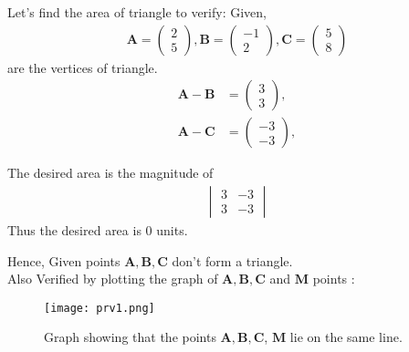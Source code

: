 \documentclass[journal,12pt,twocolumn]{IEEEtran}
\let\vec\mathbf
\newcommand{\mydet}[1]{\ensuremath{\begin{vmatrix}#1\end{vmatrix}}}
\newcommand{\myvec}[1]{\ensuremath{\begin{pmatrix}#1\end{pmatrix}}}
\begin{document}
    Let's find the area of triangle to verify:
    Given, 
    \begin{align}
		\vec{A} = \myvec{2 \\ 5} ,
		\vec{B} = \myvec{-1 \\ 2},
		\vec{C} = \myvec{5 \\ 8}
	\end{align}
	are the vertices of triangle.
	\begin{align}
	\vec{A}-\vec{B} &= \myvec{3 \\3},\\
	\vec{A}-\vec{C} &= \myvec{-3 \\-3},
	\end{align}
	
	The desired area is  the magnitude of 
    \begin{align}
     \mydet{3 & -3\\3 & -3} 
    \end{align}
    Thus the desired area is 0 units.
	
    \large Hence, Given points $\vec{A,B,C}$ don't form a triangle.\\

    \large Also Verified by plotting the graph of $\vec{A,B,C}$ and $\vec{M}$ points :

  	\begin{figure}[!ht]
		\centering
		\texttt{[image: prv1.png]}
		\caption{\large Graph showing that the points  $\vec{A}, \vec{B}, \vec{C}$, $\vec{M}$ lie on the same line.}
	\end{figure}
	
\end{document}
